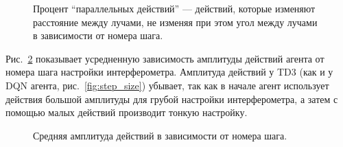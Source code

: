 \begin{figure}[ht]
\caption{Процент ``параллельных действий'' --- действий, которые изменяют расстояние между лучами, не изменяя при этом угол между лучами в зависимости от номера шага.}
\label{fig:anal2_parallel_actions}
\end{figure}

Рис.~\ref{fig:anal2_act_norm} показывает усредненную зависимость амплитуды действий агента от номера шага настройки интерферометра. Амплитуда действий у TD3 (как и у DQN агента, рис.~\ref{fig:step_size}) убывает, так как в начале агент использует действия большой амплитуды для грубой настройки интерферометра, а затем с помощью малых действий производит тонкую настройку. 

\begin{figure}[ht]
\caption{Средняя амплитуда действий в зависимости от номера шага.}
\label{fig:anal2_act_norm}
\end{figure}


